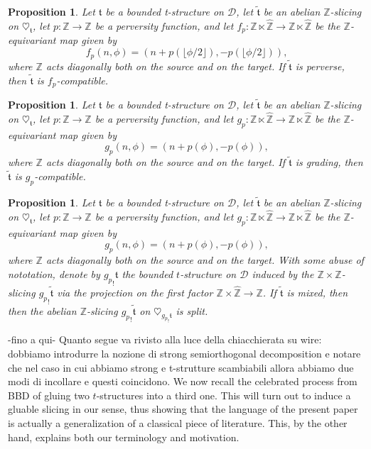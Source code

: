 \documentclass{article}
\newtheorem{prop}[thm]{Proposition}
\theoremstyle{definition}
\newcommand{\Z}{\mathbb{Z}}
\newcommand{\tee}{\mathfrak{t}}
\begin{document}
\begin{prop}\label{grad}
Let $\mathfrak{t}$ be a bounded t-structure on $\mathscr{D}$, let $\tilde{\tee}$ be an abelian $\mathbb{Z}$-slicing on $\heartsuit_{\mathfrak{t}}$, let $p\colon \Z\to \Z$ be a perversity function, and let $f_p\colon \mathbb{Z} \ltimes \hat{\mathbb{Z}}\to \mathbb{Z} \ltimes \hat{\mathbb{Z}}$ be the $\Z$-equivariant map given by $$f_p(n,\phi)=(n+p(\lfloor \phi / 2 \rfloor),-p(\lfloor \phi / 2 \rfloor)),$$
where $\Z$ acts diagonally both on the source and on the target. If $\tilde{\tee}$ is perverse, then $\tilde{\tee}$ is $f_p$-compatible.
\end{prop}
\begin{prop}\label{grad2}
Let $\mathfrak{t}$ be a bounded t-structure on $\mathscr{D}$, let $\tilde{\tee}$ be an abelian $\mathbb{Z}$-slicing on $\heartsuit_{\mathfrak{t}}$,  let $p\colon \Z\to \Z$ be a perversity function, and let $g_p\colon \mathbb{Z} \ltimes \hat{\mathbb{Z}}\to \mathbb{Z} \ltimes \hat{\mathbb{Z}}$ be the $\Z$-equivariant map given by $$g_p(n,\phi)=(n+p(\phi),-p(\phi)),$$
where $\Z$ acts diagonally both on the source and on the target. If $\tilde{\tee}$ is grading, then $\tilde{\tee}$ is $g_p$-compatible.
\end{prop}
\begin{prop}\label{grad3}
Let $\mathfrak{t}$ be a bounded t-structure on $\mathscr{D}$, let $\tilde{\tee}$ be an abelian $\mathbb{Z}$-slicing on $\heartsuit_{\mathfrak{t}}$,  let $p\colon \Z\to \Z$ be a perversity function, and let $g_p\colon \mathbb{Z} \ltimes \hat{\mathbb{Z}}\to \mathbb{Z} \ltimes \hat{\mathbb{Z}}$ be the $\Z$-equivariant map given by $$g_p(n,\phi)=(n+p(\phi),-p(\phi)),$$
where $\Z$ acts diagonally both on the source and on the target. With some abuse of nototation, denote by ${g_p}_!\tee$ the bounded $t$-structure on $\mathscr{D}$ induced by the $\Z\times \hat{\Z}$-slicing ${g_p}_!\tilde{\tee}$ via the projection on the first factor $\Z\times \hat{\Z}\to \Z$.
If $\tilde{\tee}$ is mixed, then  then the abelian $\mathbb{Z}$-slicing ${g_p}_!\tilde{\tee}$ on $\heartsuit_{{g_p}_!\tee}$ is split. 
\end{prop}



{\Huge -fino a qui-}
{\color{red} Quanto segue va rivisto alla luce della chiacchierata su wire: dobbiamo introdurre la nozione di strong semiorthogonal decomposition e notare che nel caso in cui abbiamo strong e t-strutture scambiabili allora abbiamo due modi di incollare e questi coincidono.}
We now recall the celebrated process from {\color{red} BBD} of gluing two $t$-structures into a third one. This will turn out to induce a gluable slicing in our sense, thus showing that the language of the present paper is actually a generalization of a classical piece of literature. This, by the other hand, explains both our terminology and motivation.
\end{document}
